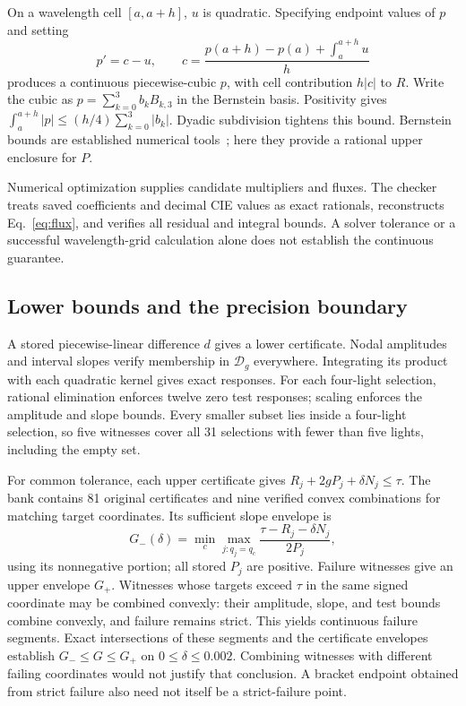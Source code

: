 \documentclass{optica-article}
\newcommand{\Dg}{\mathcal D_g}
\begin{document}
On a wavelength cell $[a,a+h]$, $u$ is quadratic. Specifying endpoint values of $p$ and setting
\begin{equation}
 p'=c-u,\qquad
 c=\frac{p(a+h)-p(a)+\int_a^{a+h}u}{h}                  \label{eq:flux}
\end{equation}
produces a continuous piecewise-cubic $p$, with cell contribution $h|c|$ to $R$. Write the cubic as $p=\sum_{k=0}^3 b_k B_{k,3}$ in the Bernstein basis. Positivity gives
$\int_a^{a+h}|p|\leq(h/4)\sum_{k=0}^3|b_k|$.
Dyadic subdivision tightens this bound. Bernstein bounds are established numerical tools~\cite{ricciardi}; here they provide a rational upper enclosure for $P$.

Numerical optimization supplies candidate multipliers and fluxes. The checker treats saved coefficients and decimal CIE values as exact rationals, reconstructs Eq.~\eqref{eq:flux}, and verifies all residual and integral bounds. A solver tolerance or a successful wavelength-grid calculation alone does not establish the continuous guarantee.

\subsection{Lower bounds and the precision boundary}
A stored piecewise-linear difference $d$ gives a lower certificate. Nodal amplitudes and interval slopes verify membership in $\Dg$ everywhere. Integrating its product with each quadratic kernel gives exact responses. For each four-light selection, rational elimination enforces twelve zero test responses; scaling enforces the amplitude and slope bounds. Every smaller subset lies inside a four-light selection, so five witnesses cover all 31 selections with fewer than five lights, including the empty set.

For common tolerance, each upper certificate gives $R_j+2gP_j+\delta N_j\leq\tau$. The bank contains 81 original certificates and nine verified convex combinations for matching target coordinates. Its sufficient slope envelope is
\begin{equation}
 G_-(\delta)=\min_{c}\max_{j:q_j=q_c}
       \frac{\tau-R_j-\delta N_j}{2P_j},                \label{eq:lowerenv}
\end{equation}
using its nonnegative portion; all stored $P_j$ are positive. Failure witnesses give an upper envelope $G_+$. Witnesses whose targets exceed $\tau$ in the same signed coordinate may be combined convexly: their amplitude, slope, and test bounds combine convexly, and failure remains strict. This yields continuous failure segments. Exact intersections of these segments and the certificate envelopes establish
$G_-\leq G\leq G_+$ on $0\leq\delta\leq0.002$.
Combining witnesses with different failing coordinates would not justify that conclusion. A bracket endpoint obtained from strict failure also need not itself be a strict-failure point.
\end{document}
